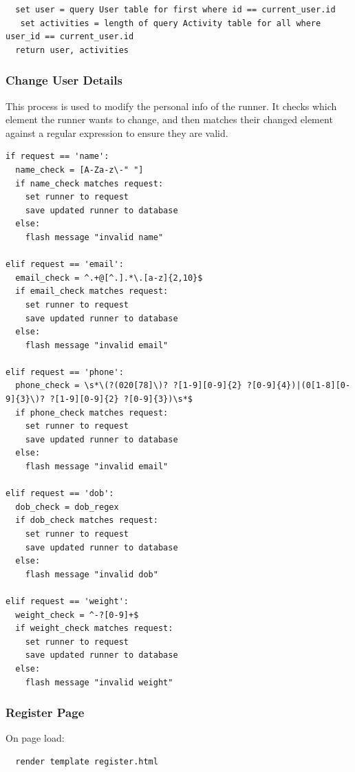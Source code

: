 \documentclass{article}[12pt,a4paper]
\begin{document}
\begin{verbatim}
  set user = query User table for first where id == current_user.id
   set activities = length of query Activity table for all where user_id == current_user.id
  return user, activities
\end{verbatim}

\subsubsection{Change User Details}
This process is used to modify the personal info of the runner. It checks which element the runner wants to change, and then matches their changed element against a regular expression to ensure they are valid. 

\begin{verbatim}
if request == 'name':
  name_check = [A-Za-z\-" "]
  if name_check matches request:
    set runner to request
    save updated runner to database
  else:
    flash message "invalid name"

elif request == 'email':
  email_check = ^.+@[^.].*\.[a-z]{2,10}$
  if email_check matches request:
    set runner to request
    save updated runner to database
  else:
    flash message "invalid email"

elif request == 'phone':
  phone_check = \s*\(?(020[78]\)? ?[1-9][0-9]{2} ?[0-9]{4})|(0[1-8][0-9]{3}\)? ?[1-9][0-9]{2} ?[0-9]{3})\s*$
  if phone_check matches request:
    set runner to request
    save updated runner to database
  else:
    flash message "invalid email"

elif request == 'dob':
  dob_check = dob_regex
  if dob_check matches request:
    set runner to request
    save updated runner to database
  else:
    flash message "invalid dob"

elif request == 'weight':
  weight_check = ^-?[0-9]+$
  if weight_check matches request:
    set runner to request
    save updated runner to database
  else:
    flash message "invalid weight"
\end{verbatim}

\subsubsection{Register Page}
On page load:
\begin{verbatim}
  render template register.html
\end{verbatim}
\end{document}
